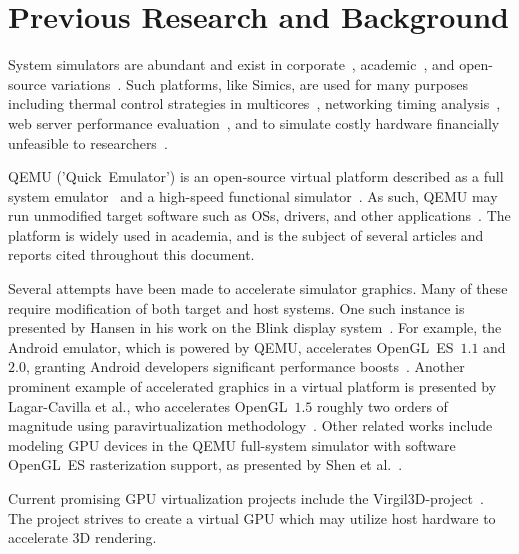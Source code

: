 
\section{Previous Research and Background}
\label{sec:previousresearch}
System simulators are abundant and exist in corporate~, academic~, and open-source variations~.
Such platforms, like Simics, are used for many purposes including thermal control strategies in multicores~, networking timing analysis~, web server performance evaluation~, and to simulate costly hardware financially unfeasible to researchers~.

QEMU ('Quick~Emulator') is an open-source virtual platform described as a full system emulator~ and a high-speed functional simulator~.
As such, QEMU may run unmodified target software such as OSs, drivers, and other applications~.
The platform is widely used in academia, and is the subject of several articles and reports cited throughout this document.

Several attempts have been made to accelerate simulator graphics.
Many of these require modification of both target and host systems.
One such instance is presented by Hansen in his work on the Blink display system~.
For example, the Android emulator, which is powered by QEMU, accelerates OpenGL~ES~$1.1$ and $2.0$, granting Android developers significant performance boosts~.
Another prominent example of accelerated graphics in a virtual platform is presented by Lagar-Cavilla et al., who accelerates OpenGL~$1.5$ roughly two orders of magnitude using paravirtualization methodology~.
Other related works include modeling GPU devices in the QEMU full-system simulator with software OpenGL~ES rasterization support, as presented by Shen et al.~.

Current promising GPU virtualization projects include the Virgil3D-project~.
The project strives to create a virtual GPU which may utilize host hardware to accelerate 3D rendering.

